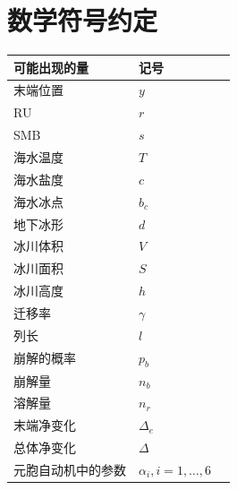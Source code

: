 \documentclass[fontset=none]{ctexbook} %
\theoremstyle{plain}
\numberwithin{equation}{subsection}%
\numberwithin{figure}{subsection}
\begin{document}
\clearpage
\chapter{数学符号约定}

\begin{table}[htbp] %
  \centering %
  \label{tab:example} %
    \begin{tabularx}{\textwidth}{XXX}
    \toprule %
    可能出现的量 & 记号 \\
    \midrule %
    末端位置 & $y$  \\ %
    RU & $r$  \\
    SMB & $s$  \\
    海水温度&$T$\\
    海水盐度&$c$\\
    海水冰点&$b_c$\\
    地下冰形&$d$\\
    冰川体积&$V$\\
    冰川面积&$S$\\
    冰川高度&$h$\\
    迁移率&$\gamma$\\
    列长&$l$\\
    崩解的概率&\(p_b\)\\
    崩解量&$n_b$\\
    溶解量&\(n_r\)\\
    末端净变化&\(\Delta_e\)\\
    总体净变化&\(\Delta\)\\
    元胞自动机中的参数&\(\alpha_i,i=1,\dots,6\)\\
    \bottomrule %
    \end{tabularx}
    
\end{table}
\tableofcontents %
\clearpage
\mainmatter









\end{document}
